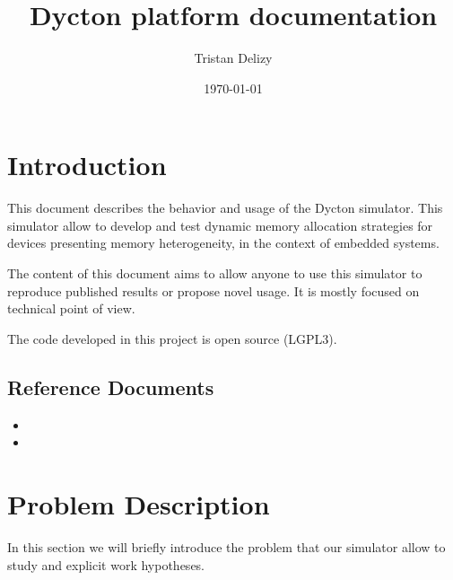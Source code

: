 \documentclass[10 pt]{article}
\begin{document}
\title{Dycton platform documentation}
\date{\today}
\author{Tristan Delizy}
\maketitle
\pagestyle{empty}

\tableofcontents
\newpage




\section{Introduction}
This document describes the behavior and usage of the Dycton simulator.
This simulator allow to develop and test dynamic memory allocation strategies for devices presenting memory heterogeneity, in the context of embedded systems.

The content of this document aims to allow anyone to use this simulator to reproduce published results or propose novel usage. It is mostly focused on technical point of view.

The code developed in this project is open source (LGPL3).




\subsection{Reference Documents}
\begin{itemize}
  \item {}
  \item {}
\end{itemize}


\section{Problem Description}
In this section we will briefly introduce the problem that our simulator allow to study and explicit work hypotheses.
\end{document}
